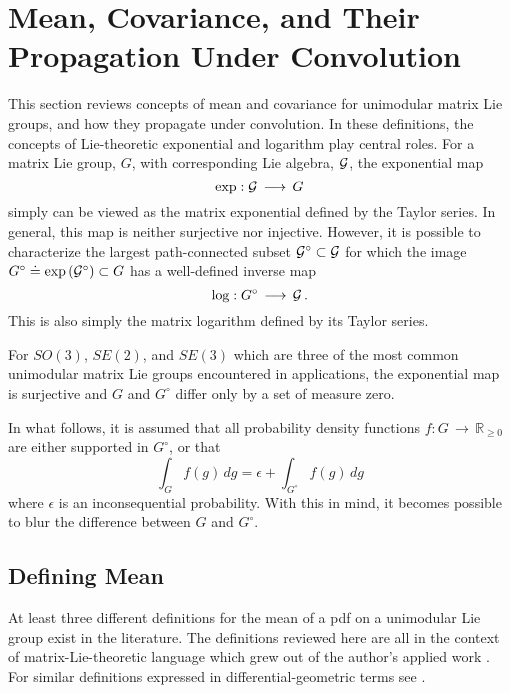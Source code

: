 \documentclass{svmult}
\begin{document}
\section{Mean, Covariance, and Their Propagation Under Convolution} \label{covariancedefsec}

This section reviews concepts of mean and covariance for unimodular matrix Lie groups, and how they propagate under convolution. In these definitions, the concepts of Lie-theoretic exponential and logarithm play central roles. For a matrix Lie group, $G$, with corresponding
Lie algebra, ${\cal G}$, the exponential map
$$ \exp: {\cal G} \,\longrightarrow\, G $$
simply can be viewed as the matrix exponential defined by the Taylor series. In general, this map is neither surjective nor injective. However, it is possible to characterize the largest path-connected subset
${\cal G}^{\circ} \subset {\cal G}$ for which the image $G^{\circ} \doteq \exp\left({\cal G}^{\circ}\right) \subset G$ has a well-defined inverse map
$$ \log: G^{\circ} \,\longrightarrow\, {\cal G}\,. $$
This is also simply the matrix logarithm defined by its Taylor series.

For $SO(3)$, $SE(2)$, and $SE(3)$ which are three of the most common unimodular matrix Lie groups encountered in applications, the exponential map is surjective and $G$ and $G^{\circ}$ differ only by a set of measure zero.

In what follows, it is assumed that all probability density functions $f:G\,\longrightarrow\,\mathbb{R}_{\geq 0}$ are either supported in $G^{\circ}$, or
that 
$$ \int_{G} f(g)\,dg = \epsilon + \int_{G^{\circ}} f(g)\,dg $$
where $\epsilon$ is an inconsequential probability. With this in mind, it becomes possible
to blur the difference between $G$ and $G^{\circ}$.

\subsection{Defining Mean}

At least three different definitions for the mean of a pdf on a unimodular Lie group exist in the literature. The definitions reviewed here are all in the context of matrix-Lie-theoretic
language which grew out of the author's applied work \cite{wangprop1,wangprop2}. For similar definitions expressed in differential-geometric terms see \cite{pennec96,pennec06,pennec12}.
\end{document}
